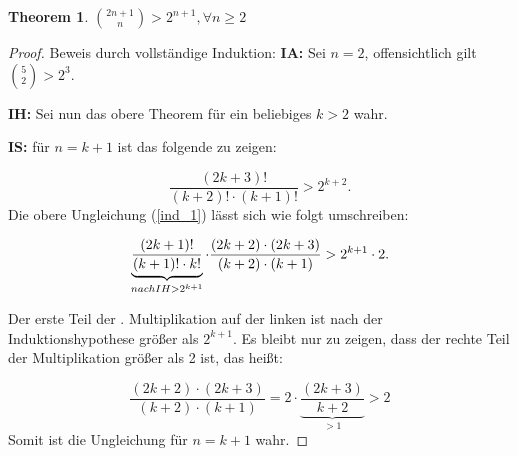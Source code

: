 \documentclass[12pt,oneside]{article}
\newtheorem{theorem}{Theorem}[section]
\theoremstyle{remark}
\theoremstyle{definition}
\begin{document}
\begin{flushleft}
\smallskip

\begin{theorem}\label{useful_theorem_for_proof}
${2n + 1 \choose n} > 2^{n+1}, \forall n \geq 2$
\end{theorem}

\begin{proof}
Beweis durch vollständige Induktion:\newline\newline
\textbf{IA: } Sei $n = 2$, offensichtlich gilt ${5 \choose 2} > 2^3$.\newline\newline

\textbf{IH: }Sei nun das obere Theorem für ein beliebiges $k > 2 $ wahr.\newline\newline

\textbf{IS: }für $n = k + 1$ ist das folgende zu zeigen: 

\begin{equation}\label{ind_1}
    \frac{(2k + 3)!}{(k + 2)!\cdot(k + 1)!} > 2^{k+2}.
\end{equation}
\newline\newline
Die obere Ungleichung (\ref{ind_1}) lässt sich wie folgt umschreiben:\newline\newline


\begin{equation}
     \underbrace{\frac{(2k + 1)!}{(k + 1)! \cdot k!}}_{nach IH > 2^{k + 1}} \cdot \frac{(2k + 2) \cdot (2k + 3)}{(k + 2) \cdot (k + 1)} > 2^{k+1} \cdot 2.\newline\newline
\end{equation}

Der erste Teil der . Multiplikation auf der linken ist nach der Induktionshypothese größer als $2^{k+1}$. Es bleibt nur zu zeigen, dass der rechte Teil der Multiplikation größer als 2 ist, das heißt: \newline\newline

\begin{equation}\label{ind_eq}
\frac{(2k + 2) \cdot (2k + 3)}{(k + 2) \cdot (k + 1)} = 2 \cdot \underbrace{\frac{(2k + 3 )}{k + 2}}_{ > 1} > 2
\end{equation}
Somit ist die Ungleichung für $n = k + 1$ wahr.
\end{proof}
\end{flushleft}
\end{document}
